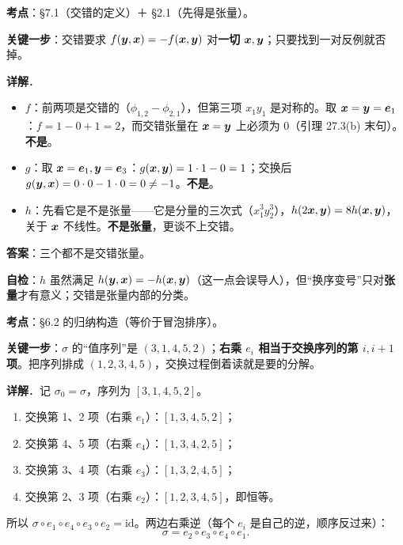 \documentclass[11pt]{ctexart}
\renewcommand{\qbreak}{\needspace{0.22\textheight}}
\begin{document}
\qbreak
{}\label{ax9}
\qbreak
{}

\textbf{考点}：§7.1（交错的定义）＋ §2.1（先得是张量）。

\textbf{关键一步}：交错要求 $f(\boldsymbol{y},\boldsymbol{x})=-f(\boldsymbol{x},\boldsymbol{y})$ 对\textbf{一切} $\boldsymbol{x},\boldsymbol{y}$；只要找到一对反例就否掉。

\textbf{详解}．
\begin{itemize}
  \item $f$：前两项是交错的（$\phi_{1,2}-\phi_{2,1}$），但第三项 $x_1y_1$ 是对称的。取 $\boldsymbol{x}=\boldsymbol{y}=\boldsymbol{e}_1$：$f=1-0+1=2$，而交错张量在 $\boldsymbol{x}=\boldsymbol{y}$ 上必须为 $0$（引理 27.3(b) 末句）。\textbf{不是}。
  \item $g$：取 $\boldsymbol{x}=\boldsymbol{e}_1,\boldsymbol{y}=\boldsymbol{e}_3$：$g(\boldsymbol{x},\boldsymbol{y})=1\cdot1-0=1$；交换后 $g(\boldsymbol{y},\boldsymbol{x})=0\cdot0-1\cdot0=0\ne-1$。\textbf{不是}。
  \item $h$：先看它是不是张量——它是分量的三次式（$x_1^3y_2^3$），$h(2\boldsymbol{x},\boldsymbol{y})=8h(\boldsymbol{x},\boldsymbol{y})$，关于 $\boldsymbol{x}$ 不线性。\textbf{不是张量}，更谈不上交错。
\end{itemize}

\textbf{答案}：三个都不是交错张量。

\textbf{自检}：$h$ 虽然满足 $h(\boldsymbol{y},\boldsymbol{x})=-h(\boldsymbol{x},\boldsymbol{y})$（这一点会误导人），但“换序变号”只对\textbf{张量}才有意义；交错是张量内部的分类。

\qbreak
{}\label{ax10}
\qbreak
{}

\textbf{考点}：§6.2 的归纳构造（等价于冒泡排序）。

\textbf{关键一步}：$\sigma$ 的“值序列”是 $(3,1,4,5,2)$；\textbf{右乘 $e_i$ 相当于交换序列的第 $i,i+1$ 项}。把序列排成 $(1,2,3,4,5)$，交换过程倒着读就是要的分解。

\textbf{详解}．记 $\sigma_0=\sigma$，序列为 $[3,1,4,5,2]$。
\begin{enumerate}
  \item 交换第 1、2 项（右乘 $e_1$）：$[1,3,4,5,2]$；
  \item 交换第 4、5 项（右乘 $e_4$）：$[1,3,4,2,5]$；
  \item 交换第 3、4 项（右乘 $e_3$）：$[1,3,2,4,5]$；
  \item 交换第 2、3 项（右乘 $e_2$）：$[1,2,3,4,5]$，即恒等。
\end{enumerate}
所以 $\sigma\circ e_1\circ e_4\circ e_3\circ e_2=\mathrm{id}$。两边右乘逆（每个 $e_i$ 是自己的逆，顺序反过来）：
\[ \sigma=e_2\circ e_3\circ e_4\circ e_1. \]
\end{document}

